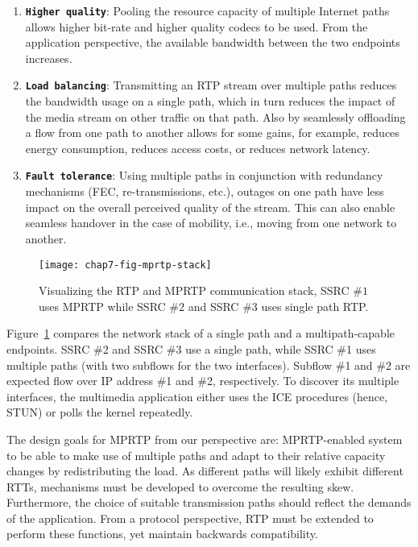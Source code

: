 \begin{enumerate}
\setlength{\itemsep}{5pt}

\item \textbf{\texttt{Higher quality}}: Pooling the resource capacity of
multiple Internet paths allows higher bit-rate and higher quality codecs to be
used. From the application perspective, the available bandwidth between the
two endpoints increases.

\item \textbf{\texttt{Load balancing}}: Transmitting an RTP stream over
multiple paths reduces the bandwidth usage on a single path, which in turn
reduces the impact of the media stream on other traffic on that path. Also by
seamlessly offloading a flow from one path to another allows for some gains,
for example, reduces energy consumption, reduces access costs, or reduces
network latency.

\item \textbf{\texttt{Fault tolerance}}: Using multiple paths in conjunction
with redundancy mechanisms (FEC, re-transmissions, etc.), outages on one path
have less impact on the overall perceived quality of the stream. This can also
enable seamless handover in the case of mobility, i.e., moving from one
network to another.

\end{enumerate}


\begin{figure}
\centerline {
\texttt{[image: chap7-fig-mprtp-stack]}
}
\caption{Visualizing the RTP and MPRTP communication stack, SSRC $\#1$ uses
MPRTP while SSRC $\#2$ and SSRC $\#3$ uses single path RTP.}
\label{chap7:fig_mprtp_arch}
\end{figure}

Figure~\ref{chap7:fig_mprtp_arch} compares the network stack of a single path
and a multipath-capable endpoints. SSRC \#2 and SSRC \#3 use a single path,
while SSRC \#1 uses multiple paths (with two subflows for the two interfaces).
Subflow \#1 and \#2 are expected flow over IP address \#1 and \#2,
respectively. To discover its multiple interfaces, the multimedia application
either uses the ICE procedures (hence, STUN) or polls the kernel repeatedly.

The design goals for MPRTP from our perspective are: MPRTP-enabled system to
be able to make use of multiple paths and adapt to their relative capacity
changes by redistributing the load. As different paths will likely exhibit
different RTTs, mechanisms must be developed to overcome the resulting skew.
Furthermore, the choice of suitable transmission paths should reflect the
demands of the application. From a protocol perspective, RTP must be extended
to perform these functions, yet maintain backwards compatibility.


